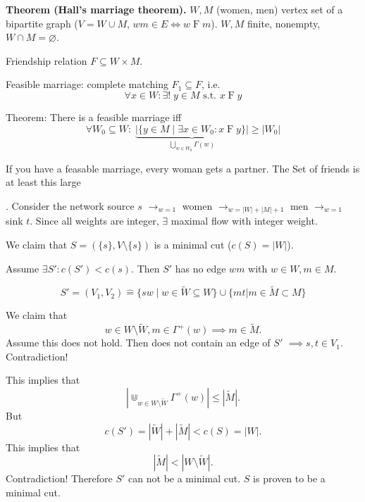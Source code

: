 

\strut{}
\textbf{Theorem (Hall's marriage theorem).}
$W, M$ (women, men) vertex set of a bipartite graph
($V=W\cup M$, $wm \in E \iff w\operatorname{F}m$). $W,M$ finite, nonempty, $W\cap M=\varnothing$.

Friendship relation $F\subseteq W\times M$.

Feasible marriage: complete matching $F_1\subseteq F$, i.e.
\[ \forall x\in W: \exists!\;y\in M\text{ s.t. }x\operatorname{F} y \]

Theorem: There is a feasible marriage iff
\[
    \forall W_0\subseteq W:\;
        \underbrace{
            |\{y\in M\mid \exists x\in W_0: x\operatorname{F} y\}|
        }_{\bigcup\limits_{w\in W_0} \Gamma(w)}
        ≥ |W_0|
\]

If you have a feasable marriage, every woman gets a partner.
The Set of friends is at least this large

\Proof.
Consider the network source $s$ $\rightarrow_{w=1}$ women $\rightarrow_{w=|W|+|M|+1}$ men $\rightarrow_{w=1}$ sink $t$.
Since all weights are integer, $\exists$ maximal flow with integer weight.



We claim that $S=(\{s\}, V \setminus \{s\})$
is a minimal cut ($c(S) = |W|$).

Assume $\exists S': c(S') < c(s)$. Then $S'$ has no edge $wm$ with $w\in W, m\in M$.

\[
S' = (V_1,V_2) \hat{=}
    \{sw\mid w \in \widetilde{W} \subseteq W \} \cup
    \{mt | m \in \widetilde{M} \subset M \}
\]

\def\GammaPlus{\Gamma^{+}}

We claim that
\[
    w\in W\setminus\widetilde{W}, m\in\GammaPlus(w)
    \implies m\in\widetilde{M}.
\]
Assume this does not hold. Then
 does not contain an edge of $S'$ $\implies s, t\in V_1$. Contradiction!

This implies that
\[
    |\Cup_{w\in W\setminus\widetilde{W}} \GammaPlus(w)|
    ≤ |\widetilde{M}|.
\]
But
\[
    c(S') = |\widetilde{W}| + |\widetilde{M}| < c(S) = |W|.
\]
This implies that
\[
    |\widetilde{M}| < |W\setminus \widetilde{W}|.
\]
Contradiction! Therefore $S'$ can not be a minimal cut. $S$ is proven to be a minimal cut.

